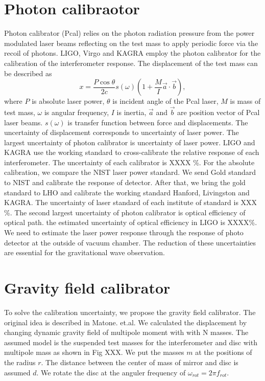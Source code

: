 \documentclass[12pt]{iopart}
\begin{document}
\section{Photon calibraotor}
Photon calibrator (Pcal) relies on the photon radiation pressure from the power modulated laser beams reflecting on the test mass to apply periodic force via the recoil of photons.
LIGO, Virgo and KAGRA employ the photon calibrator for the calibration of the interferometer response. The displacement of the test mass can be described as
\begin{equation}
 x = \frac{P \cos{\theta}}{2c} s(\omega)\left(1+\frac{M}{I}\vec{a} \cdot \vec{b} \right) , \label{pcal}
\end{equation}
where $P$ is absolute laser power, $\theta$ is incident angle of the Pcal laser, $M$ is mass of test mass, $\omega$ is angular frequency, $I$ is inertia, $\vec{a}$ and $\vec{b}$ are position vector of Pcal laser beams. $s(\omega)$ is transfer function between force and displacements.  The uncertainty of displacement corresponds to uncertainty of laser power. 
The largest uncertainty of photon calibrator is uncertainty of laser power.
LIGO and KAGRA use the working standard to cross-calibrate the relative response of each interferometer. The uncertainty of  each  calibrator is XXXX \%. For the absolute calibration, we compare the NIST laser power standard. We send Gold standard to NIST and calibrate the response of detector. After that, we bring the gold standard to LHO and calibrate the working standard Hanford, Livingston and KAGRA. The uncertainty of laser standard of each institute of standard is XXX \%. 
The second largest uncertainty of photon calibrator is optical efficiency of optical path. the estimated uncertainty of optical efficiency in LIGO is XXXX\%. We need to estimate the laser power response through the response of photo detector at the outside of vacuum chamber. 
The reduction of these uncertainties are essential for the gravitational wave observation.

\section{Gravity field calibrator}
To solve the calibration uncertainty, we propose the gravity field calibrator. The original idea is described in Matone. et.al.
We calculated the displacement by changing dynamic gravity field of multipole moment with with N masses.
The assumed model is the suspended test masses for the interferometer and disc with multipole mass as shown in Fig XXX.
We put the masses $m$ at the positions of the radius $r$. The distance between the center of mass of mirror and disc is assumed $d$.
We rotate the disc at the anguler frequency of $\omega_{rot}=2\pi f_{rot}$.
\end{document}
